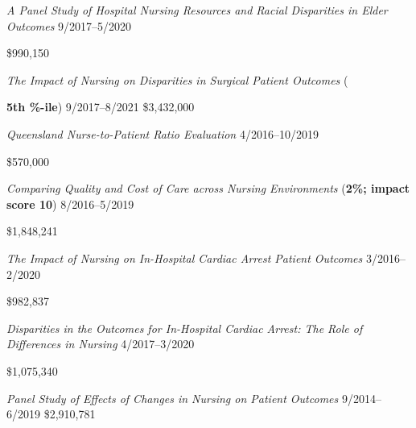 \documentclass[10pt,]{article}
\begin{document}
{{{{{{

\textit {A Panel Study of Hospital Nursing Resources and Racial Disparities in Elder Outcomes} \hfill  9/2017--5/2020 \newline
{ \hfill \$990,150 

\textit {The Impact of Nursing on Disparities in Surgical Patient Outcomes} ({\textbf{5{\small{th} {\small{\%-ile}}}}) \hfill 9/2017--8/2021 \newline
{}	\hfill \$3,432,000

\textit {Queensland Nurse-to-Patient Ratio Evaluation} \hfill  4/2016--10/2019 \newline
{ \hfill \$570,000

\textit {Comparing Quality and Cost of Care across Nursing Environments} ({\textbf{2{\small{\%}}; impact score 10}}) \hfill 8/2016--5/2019 \newline
{	\hfill \$1,848,241

\textit {The Impact of Nursing on In-Hospital Cardiac Arrest Patient Outcomes} \hfill  3/2016--2/2020 \newline
{ \hfill \$982,837

\textit {Disparities in the Outcomes for In-Hospital Cardiac Arrest: The Role of Differences in Nursing} \hfill 4/2017--3/2020 \newline
{	\hfill \$1,075,340

\textit {Panel Study of Effects of Changes in Nursing on Patient Outcomes} \hfill 9/2014--6/2019 \newline
{}	\hfill \$2,910,781

}}}}}}}}}}}}
\end{document}

